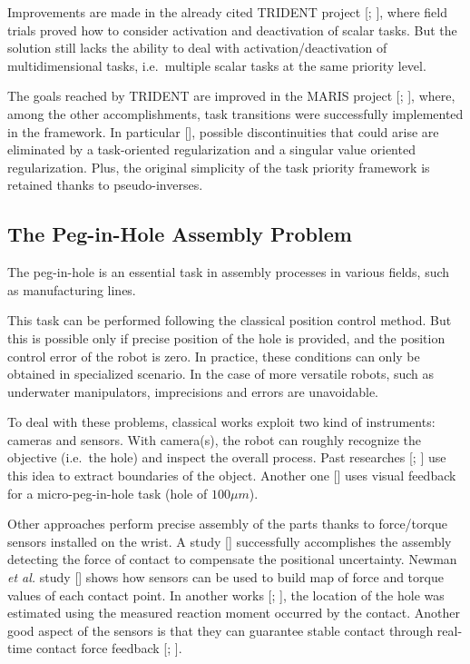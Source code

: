 Improvements are made in the already cited TRIDENT project [\cite{IntroTrident1}; \cite{IntroTrident4}], where field trials proved how to consider activation and deactivation of scalar tasks. But the solution still lacks the ability to deal with activation/deactivation of multidimensional tasks, i.e.\ multiple scalar tasks at the same priority level.

The goals reached by TRIDENT are improved in the MARIS project [\cite{IntroMaris0}; \cite{IntroTpik30}], where, among the other accomplishments, task transitions were successfully implemented in the framework. In particular [\cite{IntroMaris1}], possible discontinuities that could arise are eliminated by a task-oriented regularization and a singular value oriented regularization. Plus, the original simplicity of the task priority framework is retained thanks to pseudo-inverses.


\subsection{The Peg-in-Hole Assembly Problem}
\label{sec:artPeg}
The peg-in-hole is an essential task in assembly processes in various fields, such as manufacturing lines.

This task can be performed following the classical position control method. But this is possible only if precise position of the hole is provided, and the position control error of the robot is zero.
In practice, these conditions can only be obtained in specialized scenario. In the case of more versatile robots, such as underwater manipulators, 
imprecisions and errors are unavoidable.

To deal with these problems, classical works exploit two kind of instruments: cameras and sensors. 
With camera(s), the robot can roughly recognize the objective (i.e.\ the hole) and inspect the overall process. Past researches [\cite{IntroPeg2}; \cite{IntroPeg1}] use this idea to extract boundaries of the object. Another one [\cite{IntroPeg3}] uses visual feedback for a micro-peg-in-hole task (hole of $100 \mu m$).

Other approaches perform precise assembly of the parts thanks to force/torque sensors installed on the wrist. A study [\cite{IntroPeg4}] successfully accomplishes the assembly detecting the force of contact to compensate the positional uncertainty. Newman \textit{et al.} study [\cite{IntroPeg7}] shows how sensors can be used to build map of force and torque values of each contact point.  
In another works [\cite{IntroPeg9}; \cite{IntroPeg8}], the location of the hole was estimated using the measured reaction moment occurred by the contact.
Another good aspect of the sensors  is that they can guarantee stable contact through real-time contact force feedback [\cite{IntroPeg6}; \cite{IntroPeg5}].

